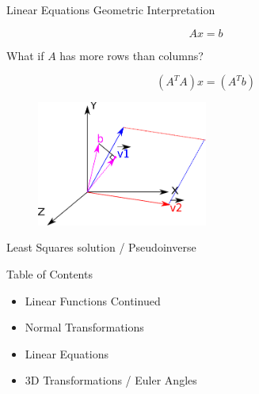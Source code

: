 \documentclass{beamer}
\begin{document}
\begin{frame}{Linear Equations Geometric Interpretation}

\[Ax = b \]

What if $A$ has more rows than columns?

\[ (A^TA)x = (A^Tb) \]

\begin{figure}[t]
	\centering
    \includegraphics[width=0.5\textwidth]{LinearEquationGeometricOverProj.pdf}
\end{figure}

Least Squares solution / Pseudoinverse

\end{frame}


\begin{frame}{Table of Contents}

\begin{itemize}[label=$\vartriangleright$]
	\item Linear Functions Continued
	\item Normal Transformations
	\item Linear Equations
\end{itemize}

\begin{itemize}[label=$\blacktriangleright$]
    \item 3D Transformations / Euler Angles
\end{itemize}

\end{frame}
\end{document}
